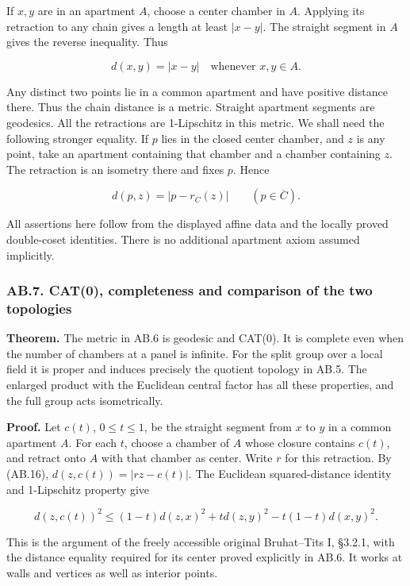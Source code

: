\documentclass[
  11pt,
]{article}
\begin{document}
If \(x,y\) are in an apartment \(A\), choose a center chamber in \(A\).
Applying its retraction to any chain gives a length at least \(|x-y|\).
The straight segment in \(A\) gives the reverse inequality. Thus

\[
 d(x,y)=|x-y|\quad\text{whenever }x,y\in A.
 \tag{AB.15}
\]

Any distinct two points lie in a common apartment and have positive
distance there. Thus the chain distance is a metric. Straight apartment
segments are geodesics. All the retractions are 1-Lipschitz in this
metric. We shall need the following stronger equality. If \(p\) lies in
the closed center chamber, and \(z\) is any point, take an apartment
containing that chamber and a chamber containing \(z\). The retraction
is an isometry there and fixes \(p\). Hence

\[
 d(p,z)=|p-r_C(z)|\qquad(p\in\overline C).
 \tag{AB.16}
\]

All assertions here follow from the displayed affine data and the
locally proved double-coset identities. There is no additional apartment
axiom assumed implicitly.

\subsubsection{AB.7. CAT(0), completeness and comparison of the two
topologies}\label{ab.7.-cat0-completeness-and-comparison-of-the-two-topologies}

\textbf{Theorem.} The metric in AB.6 is geodesic and CAT(0). It is
complete even when the number of chambers at a panel is infinite. For
the split group over a local field it is proper and induces precisely
the quotient topology in AB.5. The enlarged product with the Euclidean
central factor has all these properties, and the full group acts
isometrically.

\textbf{Proof.} Let \(c(t)\), \(0\le t\le1\), be the straight segment
from \(x\) to \(y\) in a common apartment \(A\). For each \(t\), choose
a chamber of \(A\) whose closure contains \(c(t)\), and retract onto
\(A\) with that chamber as center. Write \(r\) for this retraction. By
(AB.16), \(d(z,c(t))=|rz-c(t)|\). The Euclidean squared-distance
identity and 1-Lipschitz property give

\[
 d(z,c(t))^2
 \le(1-t)d(z,x)^2+t d(z,y)^2-t(1-t)d(x,y)^2.
 \tag{AB.17}
\]

This is the argument of the freely accessible original Bruhat--Tits I,
§3.2.1, with the distance equality required for its center proved
explicitly in AB.6. It works at walls and vertices as well as interior
points.
\end{document}
